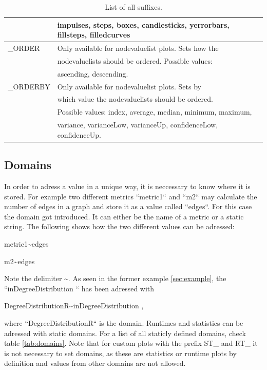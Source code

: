 \begin{table}[hp]
\begin{tabular}[h]{|l|l|}
	&	impulses, steps, boxes, candlesticks, yerrorbars, fillsteps, filledcurves\\
	\hline
	{\_}ORDER & Only available for nodevaluelist plots. Sets how the\\
	&	nodevaluelists should be ordered. Possible values:\\
	&	ascending, descending.\\
	\hline
	{\_}ORDERBY & Only available for nodevaluelist plots. Sets by\\
	&	which value the nodevaluelists should be ordered. \\
	&	Possible values: index, average, median, minimum, maximum,\\
	&	variance, varianceLow, varianceUp, confidenceLow, confidenceUp.\\
	\hline
\end{tabular}
\caption{List of all suffixes.}
\label{tab:suffixes}
\end{table}

\subsection{Domains}
In order to adress a value in a unique way, it is neccessary to know where it is stored. For example two different metrics “metric1“ and “m2“ may calculate the number of edges in a graph and store it as a value called “edges“. For this case the domain got introduced. It can either be the name of a metric or a static string. The following shows how the two different values can be adressed:

\centerline{metric1\textasciitilde edges}
\centerline{m2\textasciitilde edges}

Note the delimiter \textasciitilde .
As seen in the former example \ref{sec:example}, the “inDegreeDistribution “ has been adressed with

\centerline{DegreeDistributionR\textasciitilde inDegreeDistribution	,}

where “DegreeDistributionR“ is the domain. Runtimes and statistics can be adressed with static domains. For a list of all staticly defined domains, check table \ref{tab:domains}. Note that for custom plots with the prefix ST{\_} and RT{\_} it is not necessary to set domains, as these are statistics or runtime plots by definition and values from other domains are not allowed.

